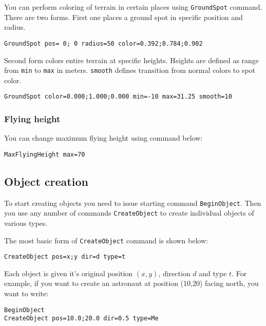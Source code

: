 You can perform coloring of terrain in certain places using \texttt{GroundSpot} command. There are two forms. First one places a ground spot in specific position and radius.

\begin{lstlisting}[style=scene]
GroundSpot pos= 0; 0 radius=50 color=0.392;0.784;0.902
\end{lstlisting}

Second form colors entire terrain at specific heights. Heights are defined as range from \texttt{min} to \texttt{max} in meters. \texttt{smooth} defines transition from normal colors to spot color.

\begin{lstlisting}[style=scene]
GroundSpot color=0.000;1.000;0.000 min=-10 max=31.25 smooth=10
\end{lstlisting}


\subsubsection{Flying height}

You can change maximum flying height using command below:

\begin{lstlisting}[style=scene]
MaxFlyingHeight max=70
\end{lstlisting}


\subsection{Object creation}

To start creating objects you need to issue starting command \texttt{BeginObject}. Then you use any number of commands \texttt{CreateObject} to create individual objects of various types.

The most basic form of \texttt{CreateObject} command is shown below:

\begin{lstlisting}[style=scene]
CreateObject pos=x;y dir=d type=t
\end{lstlisting}

Each object is given it's original position $(x, y)$, direction $d$ and type $t$. For example, if you want to create an astronaut at position (10,20) facing north, you want to write:

\begin{lstlisting}[style=scene]
BeginObject
CreateObject pos=10.0;20.0 dir=0.5 type=Me
\end{lstlisting}

